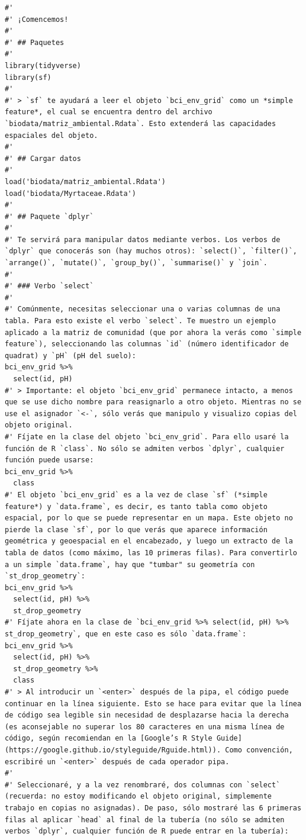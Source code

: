 \documentclass[11pt,]{article}
\begin{document}
\begin{verbatim}
#' 
#' ¡Comencemos!
#' 
#' ## Paquetes
#' 
library(tidyverse)
library(sf)
#' 
#' > `sf` te ayudará a leer el objeto `bci_env_grid` como un *simple feature*, el cual se encuentra dentro del archivo `biodata/matriz_ambiental.Rdata`. Esto extenderá las capacidades espaciales del objeto.
#' 
#' ## Cargar datos
#' 
load('biodata/matriz_ambiental.Rdata')
load('biodata/Myrtaceae.Rdata')
#'  
#' ## Paquete `dplyr`
#' 
#' Te servirá para manipular datos mediante verbos. Los verbos de `dplyr` que conocerás son (hay muchos otros): `select()`, `filter()`, `arrange()`, `mutate()`, `group_by()`, `summarise()` y `join`.
#' 
#' ### Verbo `select`
#' 
#' Comúnmente, necesitas seleccionar una o varias columnas de una tabla. Para esto existe el verbo `select`. Te muestro un ejemplo aplicado a la matriz de comunidad (que por ahora la verás como `simple feature`), seleccionando las columnas `id` (número identificador de quadrat) y `pH` (pH del suelo):
bci_env_grid %>%
  select(id, pH)
#' > Importante: el objeto `bci_env_grid` permanece intacto, a menos que se use dicho nombre para reasignarlo a otro objeto. Mientras no se use el asignador `<-`, sólo verás que manipulo y visualizo copias del objeto original.
#' Fíjate en la clase del objeto `bci_env_grid`. Para ello usaré la función de R `class`. No sólo se admiten verbos `dplyr`, cualquier función puede usarse:
bci_env_grid %>%
  class
#' El objeto `bci_env_grid` es a la vez de clase `sf` (*simple feature*) y `data.frame`, es decir, es tanto tabla como objeto espacial, por lo que se puede representar en un mapa. Este objeto no pierde la clase `sf`, por lo que verás que aparece información geométrica y geoespacial en el encabezado, y luego un extracto de la tabla de datos (como máximo, las 10 primeras filas). Para convertirlo a un simple `data.frame`, hay que "tumbar" su geometría con `st_drop_geometry`:
bci_env_grid %>%
  select(id, pH) %>%
  st_drop_geometry
#' Fíjate ahora en la clase de `bci_env_grid %>% select(id, pH) %>% st_drop_geometry`, que en este caso es sólo `data.frame`:
bci_env_grid %>%
  select(id, pH) %>%
  st_drop_geometry %>%
  class
#' > Al introducir un `<enter>` después de la pipa, el código puede continuar en la línea siguiente. Esto se hace para evitar que la línea de código sea legible sin necesidad de desplazarse hacia la derecha (es aconsejable no superar los 80 caracteres en una misma línea de código, según recomiendan en la [Google’s R Style Guide](https://google.github.io/styleguide/Rguide.html)). Como convención, escribiré un `<enter>` después de cada operador pipa.
#' 
#' Seleccionaré, y a la vez renombraré, dos columnas con `select` (recuerda: no estoy modificando el objeto original, simplemente trabajo en copias no asignadas). De paso, sólo mostraré las 6 primeras filas al aplicar `head` al final de la tubería (no sólo se admiten verbos `dplyr`, cualquier función de R puede entrar en la tubería):

\end{verbatim}
\end{document}
